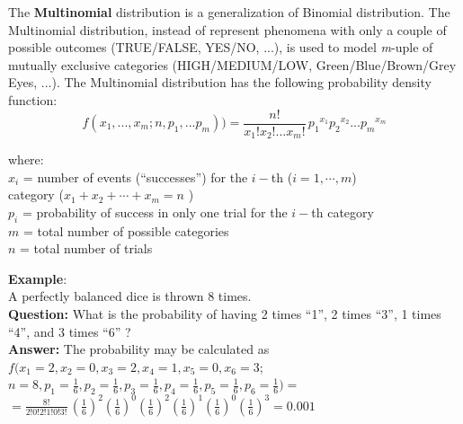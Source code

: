 
\begin{frame}
  \begin{small}
    The \textbf{Multinomial} distribution is a generalization of Binomial distribution.
    The Multinomial distribution, instead of represent phenomena with only a couple of possible outcomes (TRUE/FALSE, YES/NO, ...), is used to model \textit{m}-uple of mutually exclusive categories (HIGH/MEDIUM/LOW, Green/Blue/Brown/Grey Eyes, ...). The Multinomial distribution has the following probability density function:\\
    \vspace*{.3cm}
    $$ f(x_1,...,x_m;n, p_1,...p_m)) = \frac{n!}{x_1!x_2!... x_m!} \, {p_1}^{x_1}{p_2}^{x_2}... {p_m}^{x_m} $$
    \begin{tabbing}
      where: \hspace*{.25cm} \= \\
      \hspace*{.1cm} \> $ x_i $ = number of events (``successes'') for the $i-$th ($i=1,\cdots,m$) \\
      \hspace*{2cm} category ($ x_1+x_2 + \cdots +x_m=n$ )\\
      \hspace*{.1cm} \> $ p_i $ = probability of success in only one trial for the $i-$th category \\
      \hspace*{.1cm} \> $ m $ = total number of possible categories\\
      \hspace*{.1cm} \> $ n $ = total number of trials
    \end{tabbing}
  \end{small}
\end{frame}

\begin{frame}
  \textbf{Example}:\\
  A perfectly balanced dice is thrown 8 times. \\
  \vspace{.25cm}
  \textbf{Question:} What is the probability of having 2 times ``1'', 2 times ``3'', 1 times ``4'', and 3 times ``6'' ?\\
  \vspace{.15cm}
  \textbf{Answer:} The probability may be calculated as\\
  $ f(x_1=2,x_2=0,x_3=2,x_4=1,x_5=0,x_6=3;$ \\ 
  \hspace{.3cm}$n=8, p_1=\frac{1}{6},p_2=\frac{1}{6},p_3=\frac{1}{6},p_4=\frac{1}{6},p_5=\frac{1}{6},p_6=\frac{1}{6}) = $\\
  \vspace{.3cm}
  \hspace{.3cm}$=\frac{8!}{2!0!2!1!0!3!} \, (\frac{1}{6})^{2}(\frac{1}{6})^{0}(\frac{1}{6})^{2}(\frac{1}{6})^{1}(\frac{1}{6})^{0}(\frac{1}{6})^{3}= 0.001$\\
  \hspace*{11cm} \Square \\
\end{frame}



